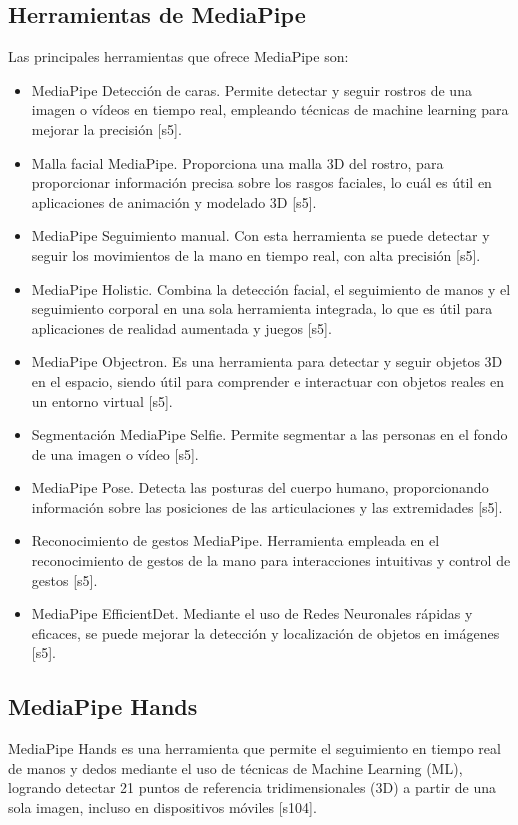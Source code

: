 \subsection{Herramientas de MediaPipe}
Las principales herramientas que ofrece MediaPipe son:
\begin{itemize}
    \item MediaPipe Detección de caras. Permite detectar y seguir rostros de una imagen o vídeos en tiempo real, empleando técnicas de machine learning para mejorar la precisión [s5].
    \item Malla facial MediaPipe. Proporciona una malla 3D del rostro, para proporcionar información precisa sobre los rasgos faciales, lo cuál es útil en aplicaciones de animación y modelado 3D [s5].
    \item MediaPipe Seguimiento manual. Con esta herramienta se puede detectar y seguir los movimientos de la mano en tiempo real, con alta precisión [s5].
    \item MediaPipe Holistic. Combina la detección facial, el seguimiento de manos y el seguimiento corporal en una sola herramienta integrada, lo que es útil para aplicaciones de realidad aumentada y juegos [s5].
    \item MediaPipe Objectron. Es una herramienta para detectar y seguir objetos 3D en el espacio, siendo útil para comprender e interactuar con objetos reales en un entorno virtual [s5].
    \item Segmentación MediaPipe Selfie. Permite segmentar a las personas en el fondo de una imagen o vídeo [s5].
    \item MediaPipe Pose. Detecta las posturas del cuerpo humano, proporcionando información sobre las posiciones de las articulaciones y las extremidades [s5].
    \item Reconocimiento de gestos MediaPipe. Herramienta empleada en el reconocimiento de gestos de la mano para interacciones intuitivas y control de gestos [s5].
    \item MediaPipe EfficientDet. Mediante el uso de Redes Neuronales rápidas y eficaces, se puede mejorar la detección y localización de objetos en imágenes [s5]. 

\end{itemize}

\subsection{MediaPipe Hands}
MediaPipe Hands es una herramienta que permite el seguimiento en tiempo real de manos y dedos mediante el uso de técnicas de Machine Learning (ML), logrando detectar 21 puntos de referencia tridimensionales (3D) a partir de una sola imagen, incluso en dispositivos móviles [s104].\\

